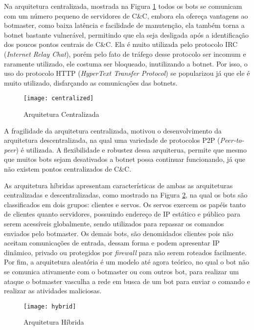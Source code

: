 Na arquitetura centralizada, mostrada na Figura \ref{fig:centralized_architecture} todos os bots se comunicam com um número pequeno de servidores de C\&C, embora ela ofereça vantagens ao botmaster, como baixa latência e facilidade de manutenção, ela também torna a botnet bastante vulnerável, permitindo que ela seja desligada após a identificação dos poucos pontos centrais de C\&C. Ela é muito utilizada pelo protocolo IRC (\textit{Internet Relay Chat}), porém pelo fato de tráfego desse protocolo ser incomum e raramente utilizado, ele costuma ser bloqueado, inutilizando a botnet. Por isso, o uso do protocolo HTTP (\textit{HyperText Transfer Protocol}) se popularizou já que ele é muito utilizado, disfarçando as comunicações das botnets.

\begin{figure}
\texttt{[image: centralized]}
\caption[Arquitetura Centralizada]{Arquitetura Centralizada\cite{wang2010advanced}} \label{fig:centralized_architecture}
\end{figure}

A fragilidade da arquitetura centralizada, motivou o desenvolvimento da arquitetura descentralizada, na qual uma variedade de protocolos P2P (\textit{Peer-to-peer}) é utilizada. A flexibilidade e robustez dessa arquiterua, permite que mesmo que muitos bots sejam desativados a botnet possa continuar funcionando, já que não existem pontos centralizados de C\&C. 

As arquitetura híbridas apresentam características de ambas as arquiteturas centralizadas e descentralizadas, como mostrado na Figura \ref{fig:hybrid_architecture}, na qual os bots são classificados em dois grupos: clientes e servos. Os servos exercem os papéis tanto de clientes quanto servidores, possuindo endereço de IP estático e público para serem acessíveis globalmente, sendo utilizados para repassar os comandos enviados pelo botmaster. Os demais bots, são denomidados clientes pois não aceitam comunicações de entrada, dessam forma e podem apresentar IP dinâmico, privado ou protegidos por \textit{firewall} para não serem roteados facilmente. Por fim, a arquitetura aleatória é um modelo até agora teórico, no qual o bot não se comunica ativamente com o botmaster ou com outros bot, para realizar um ataque o botmaster vasculha a rede em busca de um bot para enviar o comando e realizar as atividades maliciosas.

\begin{figure}
\texttt{[image: hybrid]}
\caption[Arquitetura Híbrida]{Arquitetura Híbrida\cite{wang2010advanced}} \label{fig:hybrid_architecture}
\end{figure}

